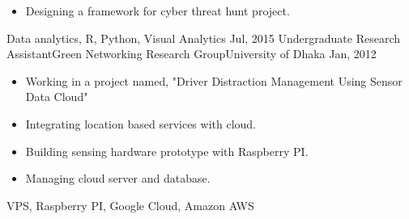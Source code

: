 \begin{experiences}
{\begin{itemize}
                        \item Designing a framework for cyber threat hunt project.                                                                   
                      \end{itemize}
                    }
                    {Data analytics, R, Python, Visual Analytics}
  \emptySeparator
  \experience
    {Jul, 2015}   {Undergraduate Research Assistant}{Green Networking Research Group}{University of Dhaka}
    {Jan, 2012} {
                      \begin{itemize}
                        \item Working in a project named, "Driver Distraction Management Using Sensor Data Cloud"
                        \item Integrating location based services with cloud.
                        \item Building sensing hardware prototype with Raspberry PI.
                        \item Managing cloud server and database.                                                                    
                      \end{itemize}
                    }
                    {VPS, Raspberry PI, Google Cloud, Amazon AWS}
  \emptySeparator
\end{experiences}

